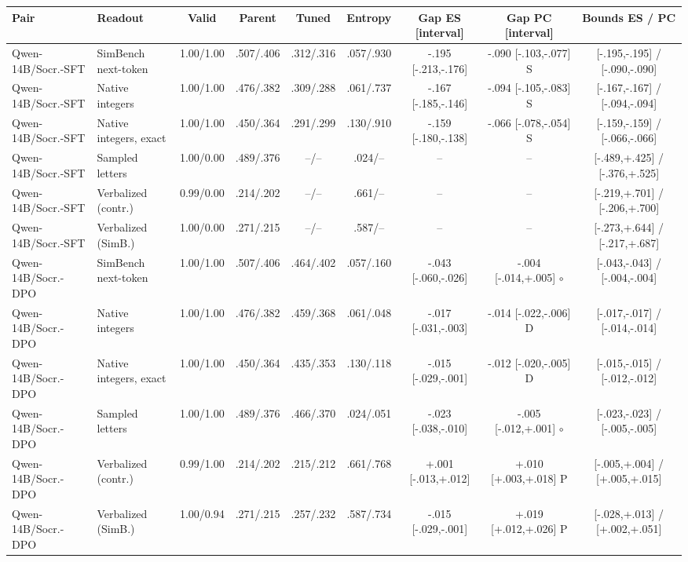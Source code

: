 \begin{table}[t]
\centering\scriptsize
\setlength{\tabcolsep}{1.1pt}
\begin{tabular}{@{}llccccccc@{}}
\toprule
Pair & Readout & Valid & Parent & Tuned & Entropy & Gap ES [interval] & Gap PC [interval] & Bounds ES / PC \\
\midrule
Qwen-14B/Socr.-SFT & SimBench next-token & 1.00/1.00 & .507/.406 & .312/.316 & .057/.930 & -.195 [-.213,-.176] & -.090 [-.103,-.077] S & [-.195,-.195] / [-.090,-.090] \\
Qwen-14B/Socr.-SFT & Native integers & 1.00/1.00 & .476/.382 & .309/.288 & .061/.737 & -.167 [-.185,-.146] & -.094 [-.105,-.083] S & [-.167,-.167] / [-.094,-.094] \\
Qwen-14B/Socr.-SFT & Native integers, exact & 1.00/1.00 & .450/.364 & .291/.299 & .130/.910 & -.159 [-.180,-.138] & -.066 [-.078,-.054] S & [-.159,-.159] / [-.066,-.066] \\
Qwen-14B/Socr.-SFT & Sampled letters & 1.00/0.00 & .489/.376 & --/-- & .024/-- & -- & -- & [-.489,+.425] / [-.376,+.525] \\
Qwen-14B/Socr.-SFT & Verbalized (contr.) & 0.99/0.00 & .214/.202 & --/-- & .661/-- & -- & -- & [-.219,+.701] / [-.206,+.700] \\
Qwen-14B/Socr.-SFT & Verbalized (SimB.) & 1.00/0.00 & .271/.215 & --/-- & .587/-- & -- & -- & [-.273,+.644] / [-.217,+.687] \\
Qwen-14B/Socr.-DPO & SimBench next-token & 1.00/1.00 & .507/.406 & .464/.402 & .057/.160 & -.043 [-.060,-.026] & -.004 [-.014,+.005] $\circ$ & [-.043,-.043] / [-.004,-.004] \\
Qwen-14B/Socr.-DPO & Native integers & 1.00/1.00 & .476/.382 & .459/.368 & .061/.048 & -.017 [-.031,-.003] & -.014 [-.022,-.006] D & [-.017,-.017] / [-.014,-.014] \\
Qwen-14B/Socr.-DPO & Native integers, exact & 1.00/1.00 & .450/.364 & .435/.353 & .130/.118 & -.015 [-.029,-.001] & -.012 [-.020,-.005] D & [-.015,-.015] / [-.012,-.012] \\
Qwen-14B/Socr.-DPO & Sampled letters & 1.00/1.00 & .489/.376 & .466/.370 & .024/.051 & -.023 [-.038,-.010] & -.005 [-.012,+.001] $\circ$ & [-.023,-.023] / [-.005,-.005] \\
Qwen-14B/Socr.-DPO & Verbalized (contr.) & 0.99/1.00 & .214/.202 & .215/.212 & .661/.768 & +.001 [-.013,+.012] & +.010 [+.003,+.018] P & [-.005,+.004] / [+.005,+.015] \\
Qwen-14B/Socr.-DPO & Verbalized (SimB.) & 1.00/0.94 & .271/.215 & .257/.232 & .587/.734 & -.015 [-.029,-.001] & +.019 [+.012,+.026] P & [-.028,+.013] / [+.002,+.051] \\

\end{tabular}
\end{table}
